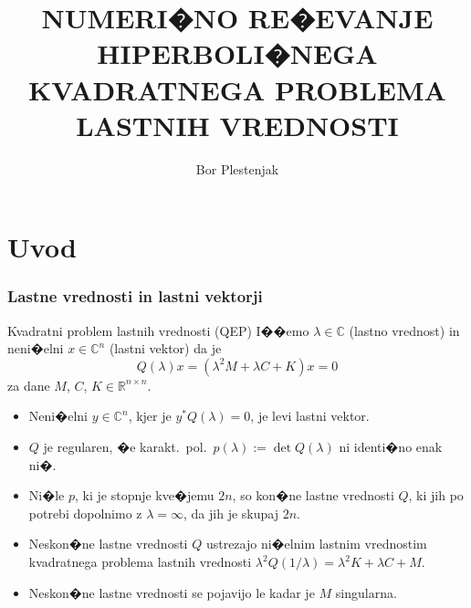 \documentclass[9pt]{beamer}
\title[NUMERI�NO RE�EVANJE HIPERBOLI�NEGA QEP]
{NUMERI�NO RE�EVANJE HIPERBOLI�NEGA KVADRATNEGA
PROBLEMA LASTNIH VREDNOSTI}
\author{Bor Plestenjak}
\def\RR{{\mathbb R}}
\def\CC{{\mathbb C}}
\begin{document}
\begin{frame}
	\titlepage
\end{frame}

\section{Uvod}
\begin{frame}
\frametitle{Lastne vrednosti in lastni vektorji}

\begin{block}{Kvadratni problem lastnih vrednosti (QEP)}
I��emo  $\lambda\in\CC$ (\alert{lastno vrednost}) in neni�elni $x\in\CC^n$ (\alert{lastni vektor}) da je
$$
  Q(\lambda)x=(\lambda^2 M+\lambda C+K)x=0
$$
za dane $M$, $C$, $K\in\RR^{n\times n}$.
\end{block}\pause

\begin{itemize}

\item Neni�elni $y\in\CC^n$, kjer je $y^*Q(\lambda)=0$, je
\alert{levi lastni vektor}.\pause

\item $Q$ je \alert{regularen}, �e karakt.~pol.~$p(\lambda):=\det Q(\lambda)$ ni identi�no enak ni�.\pause

\item Ni�le $p$, ki je stopnje kve�jemu $2n$, so kon�ne lastne vrednosti $Q$, ki jih
po potrebi dopolnimo z $\lambda=\infty$, da jih je skupaj $2n$.\pause
\item Neskon�ne lastne vrednosti $Q$ ustrezajo ni�elnim
lastnim vrednostim kvadratnega problema lastnih vrednosti
$\lambda^2 Q(1/\lambda)=\lambda^2 K+\lambda C+M$.\pause
\item Neskon�ne lastne vrednosti se pojavijo le kadar je $M$ singularna.
\end{itemize}

\end{frame}
\end{document}
